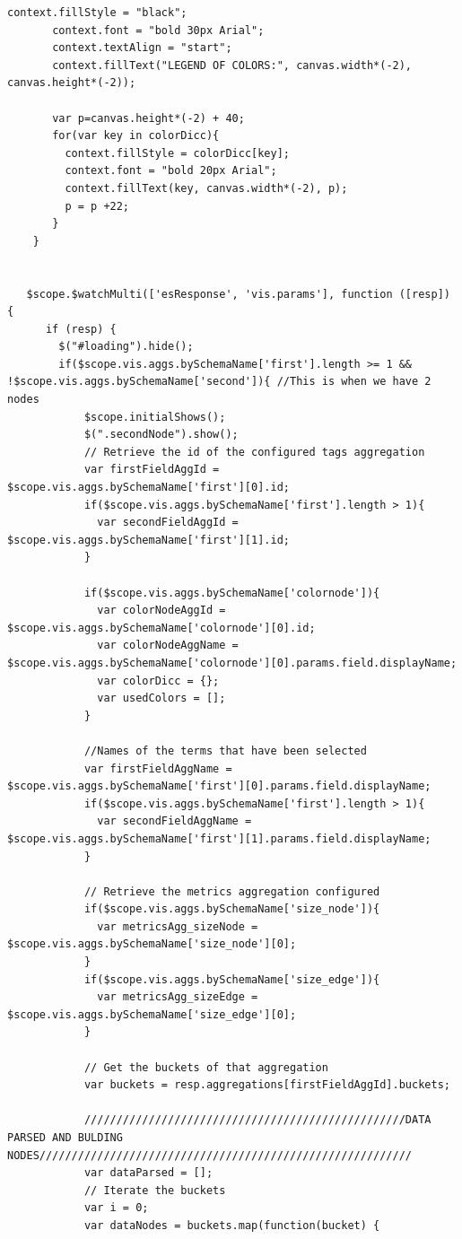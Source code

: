 \documentclass[a4paper, 12pt]{book}
\begin{document}
\begin{lstlisting}[frame=single]
       context.fillStyle = "black";
       context.font = "bold 30px Arial";
       context.textAlign = "start";
       context.fillText("LEGEND OF COLORS:", canvas.width*(-2), canvas.height*(-2));

       var p=canvas.height*(-2) + 40;
       for(var key in colorDicc){
         context.fillStyle = colorDicc[key];
         context.font = "bold 20px Arial";
         context.fillText(key, canvas.width*(-2), p);
         p = p +22;
       }
    }


   $scope.$watchMulti(['esResponse', 'vis.params'], function ([resp]) {
      if (resp) {
        $("#loading").hide();
        if($scope.vis.aggs.bySchemaName['first'].length >= 1 && !$scope.vis.aggs.bySchemaName['second']){ //This is when we have 2 nodes
            $scope.initialShows();
            $(".secondNode").show();
            // Retrieve the id of the configured tags aggregation
            var firstFieldAggId = $scope.vis.aggs.bySchemaName['first'][0].id;
            if($scope.vis.aggs.bySchemaName['first'].length > 1){
              var secondFieldAggId = $scope.vis.aggs.bySchemaName['first'][1].id;
            }

            if($scope.vis.aggs.bySchemaName['colornode']){
              var colorNodeAggId = $scope.vis.aggs.bySchemaName['colornode'][0].id;
              var colorNodeAggName = $scope.vis.aggs.bySchemaName['colornode'][0].params.field.displayName;
              var colorDicc = {};
              var usedColors = [];
            }

            //Names of the terms that have been selected
            var firstFieldAggName = $scope.vis.aggs.bySchemaName['first'][0].params.field.displayName;
            if($scope.vis.aggs.bySchemaName['first'].length > 1){
              var secondFieldAggName = $scope.vis.aggs.bySchemaName['first'][1].params.field.displayName;
            }

            // Retrieve the metrics aggregation configured
            if($scope.vis.aggs.bySchemaName['size_node']){
              var metricsAgg_sizeNode = $scope.vis.aggs.bySchemaName['size_node'][0];
            }
            if($scope.vis.aggs.bySchemaName['size_edge']){
              var metricsAgg_sizeEdge = $scope.vis.aggs.bySchemaName['size_edge'][0];
            }

            // Get the buckets of that aggregation
            var buckets = resp.aggregations[firstFieldAggId].buckets;

            //////////////////////////////////////////////////DATA PARSED AND BULDING NODES//////////////////////////////////////////////////////////
            var dataParsed = [];
            // Iterate the buckets
            var i = 0;
            var dataNodes = buckets.map(function(bucket) {


\end{lstlisting}
\end{document}
